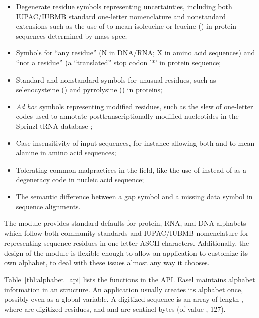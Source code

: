 \begin{itemize}
  \item Degenerate residue symbols representing uncertainties,
        including both IUPAC/IUBMB standard one-letter nomenclature
        and nonstandard extensions such as the use of  to
        mean isoleucine or leucine () in protein sequences
        determined by mass spec;

  \item Symbols for ``any residue'' (N in DNA/RNA; X in amino acid
    sequences) and ``not a residue'' (a ``translated'' stop codon '*'
    in protein sequence;

  \item Standard and nonstandard symbols for unusual residues, such as
        selenocysteine () and pyrrolysine () in
        proteins;

  \item \emph{Ad hoc} symbols representing modified residues, such as
        the slew of one-letter codes used to annotate
        posttranscriptionally modified nucleotides in the Sprinzl tRNA
        database \citep{Sprinzl98};

  \item Case-insensitivity of input sequences, for instance allowing
        both  and  to mean alanine in amino acid
        sequences;

  \item Tolerating common malpractices in the field, like the use of
        instead of  as a degeneracy code in nucleic
       acid sequence;

  \item The semantic difference between a gap symbol and a missing
        data symbol in sequence alignments.
\end{itemize}        

The  module provides standard defaults for protein,
RNA, and DNA alphabets which follow both community standards and
IUPAC/IUBMB nomenclature for representing sequence residues in
one-letter ASCII characters. Additionally, the design of the
 module is flexible enough to allow an application to
customize its own alphabet, to deal with these issues almost any way
it chooses.

Table~\ref{tbl:alphabet_api} lists the functions in the
 API.  Easel maintains alphabet information in an
 structure. An application usually creates its
alphabet once, possibly even as a global variable.  A digitized
sequence  is an  array of length
, where  are digitized residues, and
 and  are sentinel bytes (of value
, 127).

